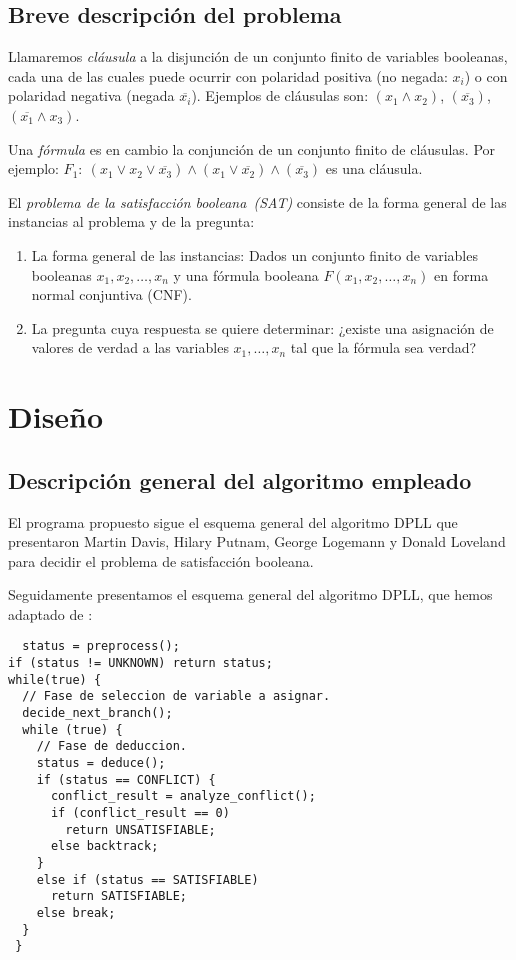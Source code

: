 \documentclass[12pt,lettersize]{article}
\begin{document}
\subsection{Breve descripción del problema} 
Llamaremos \emph{cláusula} a la disjunción de un conjunto finito de variables
booleanas, cada una de las cuales puede ocurrir con polaridad positiva (no
negada: $x_i$) o con polaridad negativa (negada $\overline{x_i}$).  
Ejemplos de cláusulas son: $(x_1 \wedge x_2)$, $(\overline{x_3})$,
$(\overline{x_1} \wedge x_3)$.

Una \emph{fórmula} es en cambio la conjunción de un conjunto finito de
cláusulas. Por ejemplo: $F_1:\ (x_1 \vee x_2 \vee \overline{x_3}) \wedge (x_1
\vee \overline{x_2}) \wedge (\overline{x_3})$ es una cláusula.

El \emph{problema de la satisfacción booleana~(SAT)} consiste de la
forma general de las instancias al problema y de la pregunta: \vspace{-2.5mm}
\begin{enumerate}
\item La forma general de las instancias: Dados un conjunto finito de variables
  booleanas $x_1,x_2,\ldots,x_n$ y una fórmula booleana $F(x_1,x_2,\ldots,x_n)$
  en forma normal conjuntiva (CNF).
\item La pregunta cuya respuesta se quiere determinar: ¿existe una asignación de
  valores de verdad a las variables $x_1,\ldots, x_n$ tal que la fórmula sea
  verdad?
\end{enumerate}

\section{Diseño}

\subsection{Descripción general del algoritmo empleado}
El programa propuesto sigue el esquema general del algoritmo DPLL que presentaron
Martin Davis, Hilary Putnam, George Logemann y Donald Loveland para decidir el
problema de satisfacción booleana.

Seguidamente presentamos el esquema general del algoritmo DPLL, que hemos
adaptado de \cite{Zhang}:

\begin{lstlisting}
  status = preprocess(); 
if (status != UNKNOWN) return status; 
while(true) { 
  // Fase de seleccion de variable a asignar.
  decide_next_branch(); 
  while (true) { 
    // Fase de deduccion.
    status = deduce(); 
    if (status == CONFLICT) { 
      conflict_result = analyze_conflict(); 
      if (conflict_result == 0) 
        return UNSATISFIABLE; 
      else backtrack; 
    } 
    else if (status == SATISFIABLE) 
      return SATISFIABLE; 
    else break; 
  } 
 } 
\end{lstlisting}
\vspace{-2.5mm}
\end{document}

